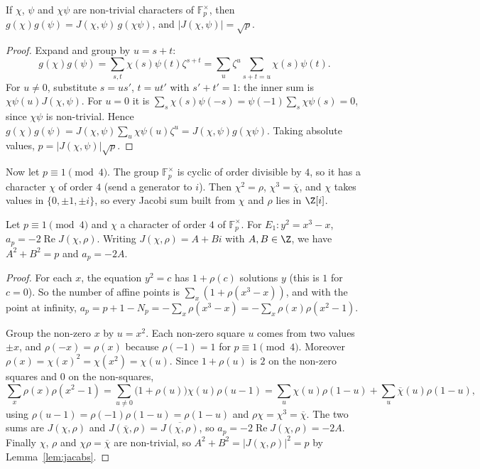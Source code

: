 \begin{lemma}\label{lem:jacabs}
If $\chi$, $\psi$ and $\chi\psi$ are non-trivial characters of $\mathbb F_p^\times$, then $g(\chi)g(\psi)=J(\chi,\psi)\,g(\chi\psi)$, and $|J(\chi,\psi)|=\sqrt p$.
\end{lemma}
\begin{proof}
Expand and group by $u=s+t$:
\[
g(\chi)g(\psi)=\sum_{s,t}\chi(s)\psi(t)\zeta^{s+t}=\sum_u\zeta^u\sum_{s+t=u}\chi(s)\psi(t).
\]
For $u\ne0$, substitute $s=us'$, $t=ut'$ with $s'+t'=1$: the inner sum is $\chi\psi(u)J(\chi,\psi)$. For $u=0$ it is
$\sum_s\chi(s)\psi(-s)=\psi(-1)\sum_s\chi\psi(s)=0$, since $\chi\psi$ is non-trivial. Hence $g(\chi)g(\psi)=J(\chi,\psi)\sum_{u}\chi\psi(u)\zeta^u=J(\chi,\psi)g(\chi\psi)$.
Taking absolute values, $p=|J(\chi,\psi)|\sqrt p$.
\end{proof}

Now let $p\equiv1\pmod4$. The group $\mathbb F_p^\times$ is cyclic of order divisible by $4$, so it has a character $\chi$ of order $4$ (send a generator to $i$).
Then $\chi^2=\rho$, $\chi^3=\overline\chi$, and $\chi$ takes values in $\{0,\pm1,\pm i\}$, so every Jacobi sum built from $\chi$ and $\rho$ lies in $\Z[i]$.

\begin{lemma}\label{lem:quarticap}
Let $p\equiv1\pmod4$ and $\chi$ a character of order $4$ of $\mathbb F_p^\times$. For $E_1:y^2=x^3-x$, $a_p=-2\operatorname{Re}J(\chi,\rho)$. Writing
$J(\chi,\rho)=A+Bi$ with $A,B\in\Z$, we have $A^2+B^2=p$ and $a_p=-2A$.
\end{lemma}
\begin{proof}
For each $x$, the equation $y^2=c$ has $1+\rho(c)$ solutions $y$ (this is $1$ for $c=0$). So the number of affine points is $\sum_x(1+\rho(x^3-x))$, and with
the point at infinity, $a_p=p+1-N_p=-\sum_x\rho(x^3-x)=-\sum_x\rho(x)\rho(x^2-1)$.

Group the non-zero $x$ by $u=x^2$. Each non-zero square $u$ comes from two values $\pm x$, and $\rho(-x)=\rho(x)$ because $\rho(-1)=1$ for $p\equiv1\pmod4$.
Moreover $\rho(x)=\chi(x)^2=\chi(x^2)=\chi(u)$. Since $1+\rho(u)$ is $2$ on the non-zero squares and $0$ on the non-squares,
\[
\sum_x\rho(x)\rho(x^2-1)=\sum_{u\ne0}\bigl(1+\rho(u)\bigr)\chi(u)\rho(u-1)=\sum_u\chi(u)\rho(1-u)+\sum_u\overline\chi(u)\rho(1-u),
\]
using $\rho(u-1)=\rho(-1)\rho(1-u)=\rho(1-u)$ and $\rho\chi=\chi^3=\overline\chi$. The two sums are $J(\chi,\rho)$ and $J(\overline\chi,\rho)=\overline{J(\chi,\rho)}$,
so $a_p=-2\operatorname{Re}J(\chi,\rho)=-2A$. Finally $\chi$, $\rho$ and $\chi\rho=\overline\chi$ are non-trivial, so $A^2+B^2=|J(\chi,\rho)|^2=p$ by
Lemma~\ref{lem:jacabs}.
\end{proof}

